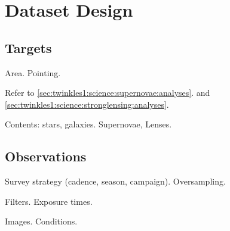 \section{Dataset Design}
\label{sec:twinkles1:design}




\subsection{Targets}

Area. Pointing.

Refer to \autoref{sec:twinkles1:science:supernovae:analyses}.
and \autoref{sec:twinkles1:science:stronglensing:analyses}.

Contents: stars, galaxies. Supernovae, Lenses.


\subsection{Observations}

Survey strategy (cadence, season, campaign). Oversampling.

Filters. Exposure times.

Images. Conditions.


